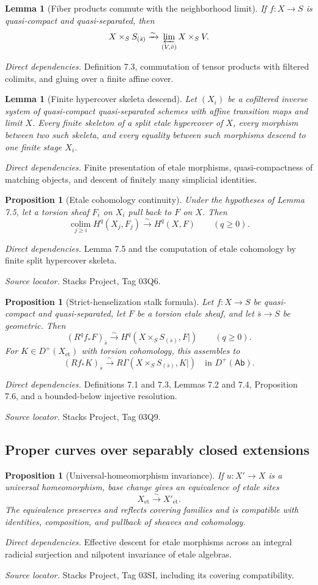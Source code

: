 \documentclass[10pt]{article}
\newtheorem{proposition}[theorem]{Proposition}
\newtheorem{lemma}[theorem]{Lemma}
\theoremstyle{definition}
\newcommand{\Ab}{\mathsf{Ab}}
\newcommand{\colim}{\operatorname*{colim}}
\newcommand{\RGamma}{R\Gamma}
\newcommand{\Dplus}{D^+}
\newcommand{\Et}{\mathrm{et}}
\newcommand{\deps}[1]{\par\smallskip\textit{Direct dependencies.} #1\par}
\newcommand{\sources}[1]{\par\textit{Source locator.} #1\par}
\begin{document}
\begin{lemma}[Fiber products commute with the neighborhood limit]
If $f:X\to S$ is quasi-compact and quasi-separated, then
\[
 X\times_SS_{(\bar s)}\xrightarrow{\sim}
 \varprojlim_{(V,\bar v)}X\times_SV.
\]
\end{lemma}
\deps{Definition 7.3, commutation of tensor products with filtered
colimits, and gluing over a finite affine cover.}

\begin{lemma}[Finite hypercover skeleta descend]
Let $(X_i)$ be a cofiltered inverse system of quasi-compact
quasi-separated schemes with affine transition maps and limit $X$.  Every
finite skeleton of a split etale hypercover of $X$, every morphism between
two such skeleta, and every equality between such morphisms descend to one
finite stage $X_i$.
\end{lemma}
\deps{Finite presentation of etale morphisms, quasi-compactness of matching
objects, and descent of finitely many simplicial identities.}

\begin{proposition}[Etale cohomology continuity]
Under the hypotheses of Lemma 7.5, let a torsion sheaf $F_i$ on $X_i$
pull back to $F$ on $X$.  Then
\[
 \colim_{j\geq i}H^q(X_j,F_j)
 \xrightarrow{\sim}H^q(X,F)
 \qquad(q\geq0).
\]
\end{proposition}
\deps{Lemma 7.5 and the computation of etale cohomology by finite split
hypercover skeleta.}
\sources{Stacks Project, Tag 03Q6.}

\begin{proposition}[Strict-henselization stalk formula]
Let $f:X\to S$ be quasi-compact and quasi-separated, let $F$ be a torsion
etale sheaf, and let $\bar s\to S$ be geometric.  Then
\[
 (R^qf_*F)_{\bar s}\xrightarrow{\sim}
 H^q(X\times_SS_{(\bar s)},F|)
 \qquad(q\geq0).
\]
For $K\in\Dplus(X_{\Et})$ with torsion cohomology, this assembles to
\[
 (Rf_*K)_{\bar s}\xrightarrow{\sim}
 \RGamma(X\times_SS_{(\bar s)},K|)
 \quad\text{in }\Dplus(\Ab).
\]
\end{proposition}
\deps{Definitions 7.1 and 7.3, Lemmas 7.2 and 7.4, Proposition 7.6, and a
bounded-below injective resolution.}
\sources{Stacks Project, Tag 03Q9.}

\subsection{Proper curves over separably closed extensions}

\begin{proposition}[Universal-homeomorphism invariance]
If $u:X'\to X$ is a universal homeomorphism, base change gives an
equivalence of etale sites
\[
 X_{\Et}\xrightarrow{\sim}X'_{\Et}.
\]
The equivalence preserves and reflects covering families and is compatible
with identities, composition, and pullback of sheaves and cohomology.
\end{proposition}
\deps{Effective descent for etale morphisms across an integral radicial
surjection and nilpotent invariance of etale algebras.}
\sources{Stacks Project, Tag 03SI, including its covering compatibility.}
\end{document}
